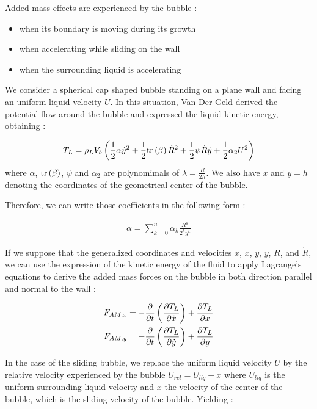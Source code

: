 Added mass effects are experienced by the bubble :

\begin{itemize}
\item when its boundary is moving during its growth
\item when accelerating while sliding on the wall 
\item when the surrounding liquid is accelerating
\end{itemize}

We consider a spherical cap shaped bubble standing on a plane wall and facing an uniform liquid velocity $U$. In this situation, Van Der Geld derived the potential flow around the bubble and expressed the liquid kinetic energy, obtaining : 

\begin{align}
T_{L}=\rho_{L}V_{b}\left(  \frac{1}{2}\alpha \dot{y}^{2} + \frac{1}{2} \mathrm{tr}\left( \beta \right)\dot{R}^{2}+\frac{1}{2}\psi \dot{R}\dot{y} + \frac{1}{2} \alpha_{2} U^{2}  \right)
\end{align}
where $\alpha$, $\mathrm{tr}\left( \beta \right)$, $\psi$ and $\alpha_{2}$ are polynomimals of $\lambda = \frac{R}{2h}$. We also have $x$ and $y=h$ denoting the coordinates of the geometrical center of the bubble.

Therefore, we can write those coefficients in the following form : 

\begin{align}
\alpha = \sum_{k=0}^{n}\alpha_{k}\frac{R^{k}}{2^{k}y^{k}}
\end{align}

If we suppose that the generalized coordinates and velocities $x$, $\dot{x}$, $y$, $\dot{y}$, $R$, and $\dot{R}$, we can use the expression of the kinetic energy of the fluid to apply Lagrange's equations to derive the added mass forces on the bubble in both direction parallel and normal to the wall :

\begin{align}
F_{AM,x}&=-\frac{\partial }{\partial t}\left( \frac{\partial T_{L}}{\partial \dot{x}} \right)+\frac{\partial T_{L}}{\partial x}\\
F_{AM,y}&=-\frac{\partial }{\partial t}\left( \frac{\partial T_{L}}{\partial \dot{y}} \right)+\frac{\partial T_{L}}{\partial y}
\end{align}

In the case of the sliding bubble, we replace the uniform liquid velocity $U$ by the relative velocity experienced by the bubble $U_{rel}=U_{liq}-\dot{x}$ where $U_{liq}$ is the uniform surrounding liquid velocity and $\dot{x}$ the velocity of the center of the bubble, which is the sliding velocity of the bubble. Yielding :



